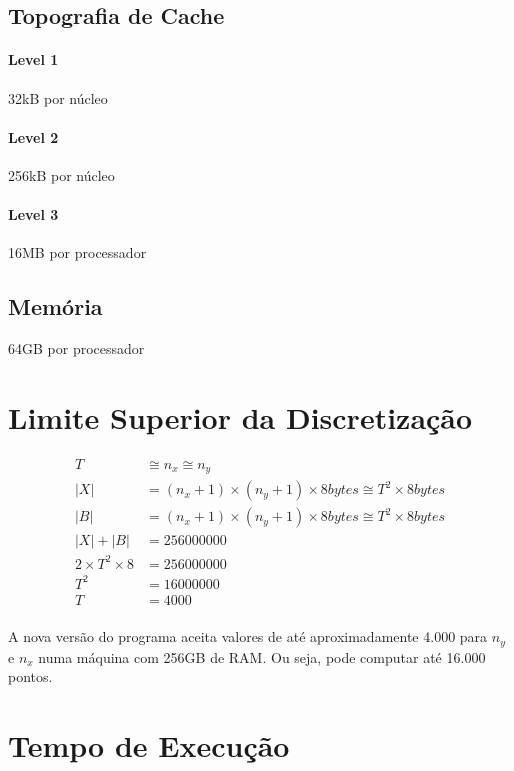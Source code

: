 \documentclass[12pt]{article}
\begin{document}
\subsection{Topografia de Cache}
\paragraph{Level 1} 32kB por núcleo
\paragraph{Level 2} 256kB por núcleo
\paragraph{Level 3} 16MB por processador

\subsection{Memória}
64GB por processador

\newpage

\section{Limite Superior da Discretização}

\begin{align}
	T &\cong n_x \cong n_y \\
	|X| &= (n_x+1)\times(n_y+1)\times8 bytes \cong T^2\times8 bytes \\
	|B| &= (n_x+1)\times(n_y+1)\times8 bytes \cong T^2\times8 bytes \\
	|X| + |B| &= 256000000 \\
	2\times T^2\times8 &= 256000000 \\
	T^2 &= 16000000\\
	T &= 4000
\end{align}

\paragraph{}
A nova versão do programa aceita valores de até aproximadamente 4.000 para $n_y$ e $n_x$ numa máquina com 256GB de RAM.
Ou seja, pode computar até 16.000 pontos.

\newpage

\section{Tempo de Execução}
\end{document}

